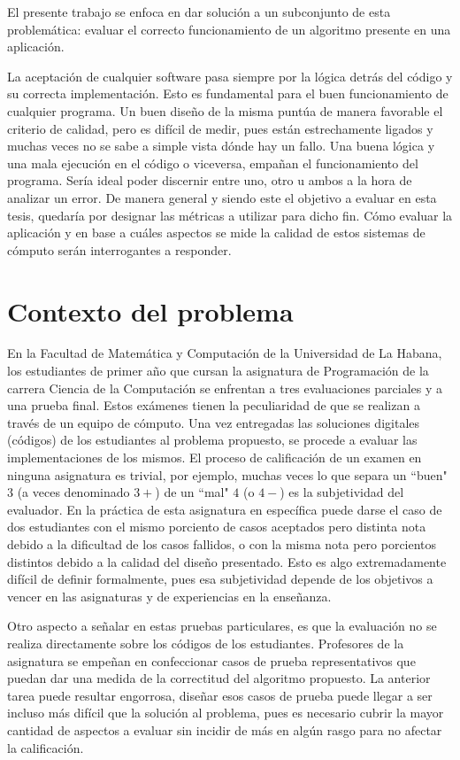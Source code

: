 \documentclass[a4paper,12pt]{book}
\begin{document}
	El presente trabajo se enfoca en dar solución a un subconjunto de esta problemática: evaluar el correcto funcionamiento de un algoritmo presente en una aplicación.
	
	La aceptación de cualquier software pasa siempre por la lógica detrás del código y su correcta implementación. Esto es fundamental para el buen funcionamiento de cualquier programa. Un buen diseño de la misma puntúa de manera favorable el criterio de calidad, pero es difícil de medir, pues están estrechamente ligados y muchas veces no se sabe a simple vista dónde hay un fallo. Una buena lógica y una mala ejecución en el código o viceversa, empañan el funcionamiento del programa. Sería ideal poder discernir entre uno, otro u ambos a la hora de analizar un error. De manera general y siendo este el objetivo a evaluar en esta tesis, quedaría por designar las métricas a utilizar para dicho fin. Cómo evaluar la aplicación y en base a cuáles aspectos se mide la calidad de estos sistemas de cómputo serán interrogantes a responder.
		
	\section{Contexto del problema}
		
		En la Facultad de Matemática y Computación de la Universidad de La Habana, los estudiantes de primer año que cursan la asignatura de Programación de la carrera Ciencia de la Computación se enfrentan a tres evaluaciones parciales y a una prueba final. Estos exámenes tienen la peculiaridad de que se realizan a través de un equipo de cómputo. Una vez entregadas las soluciones digitales (códigos) de los estudiantes al problema propuesto, se procede a evaluar las implementaciones de los mismos. El proceso de calificación de un examen en ninguna asignatura es trivial, por ejemplo, muchas veces lo que separa un ``buen" $3$ (a veces denominado $3+$) de un ``mal" $4$ (o $4-$) es la subjetividad del evaluador. En la práctica de esta asignatura en específica puede darse el caso de dos estudiantes con el mismo porciento de casos aceptados pero distinta nota debido a la dificultad de los casos fallidos, o con la misma nota pero porcientos distintos debido a la calidad del diseño presentado. Esto es algo extremadamente difícil de definir formalmente, pues esa subjetividad depende de los objetivos a vencer en las asignaturas y de experiencias en la enseñanza.
		
		Otro aspecto a señalar en estas pruebas particulares, es que la evaluación no se realiza directamente sobre los códigos de los estudiantes. Profesores de la asignatura se empeñan en confeccionar casos de prueba representativos que puedan dar una medida de la correctitud del algoritmo propuesto. La anterior tarea puede resultar engorrosa, diseñar esos casos de prueba puede llegar a ser incluso más difícil que la solución al problema, pues es necesario cubrir la mayor cantidad de aspectos a evaluar sin incidir de más en algún rasgo para no afectar la calificación.
		
\end{document}
